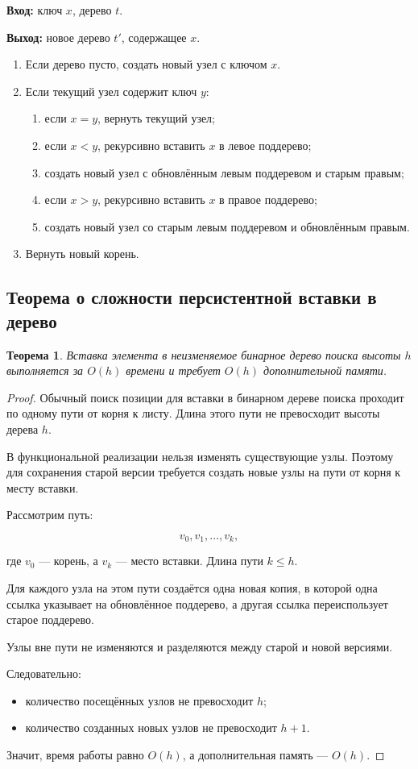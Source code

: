 \documentclass[12pt,a4paper]{article}
\newtheorem{theorem}{Теорема}
\begin{document}
\textbf{Вход:} ключ $x$, дерево $t$.

\textbf{Выход:} новое дерево $t'$, содержащее $x$.

\begin{enumerate}
  \item Если дерево пусто, создать новый узел с ключом $x$.
  \item Если текущий узел содержит ключ $y$:
  \begin{enumerate}
    \item если $x = y$, вернуть текущий узел;
    \item если $x < y$, рекурсивно вставить $x$ в левое поддерево;
    \item создать новый узел с обновлённым левым поддеревом и старым правым;
    \item если $x > y$, рекурсивно вставить $x$ в правое поддерево;
    \item создать новый узел со старым левым поддеревом и обновлённым правым.
  \end{enumerate}
  \item Вернуть новый корень.
\end{enumerate}

\subsection{Теорема о сложности персистентной вставки в дерево}

\begin{theorem}
Вставка элемента в неизменяемое бинарное дерево поиска высоты $h$ выполняется за $O(h)$ времени и требует $O(h)$ дополнительной памяти.
\end{theorem}

\begin{proof}
Обычный поиск позиции для вставки в бинарном дереве поиска проходит по одному пути от корня к листу. Длина этого пути не превосходит высоты дерева $h$.

В функциональной реализации нельзя изменять существующие узлы. Поэтому для сохранения старой версии требуется создать новые узлы на пути от корня к месту вставки.

Рассмотрим путь:

\[
v_0, v_1, \dots, v_k,
\]

где $v_0$ --- корень, а $v_k$ --- место вставки. Длина пути $k \le h$.

Для каждого узла на этом пути создаётся одна новая копия, в которой одна ссылка указывает на обновлённое поддерево, а другая ссылка переиспользует старое поддерево.

Узлы вне пути не изменяются и разделяются между старой и новой версиями.

Следовательно:
\begin{itemize}
  \item количество посещённых узлов не превосходит $h$;
  \item количество созданных новых узлов не превосходит $h+1$.
\end{itemize}

Значит, время работы равно $O(h)$, а дополнительная память --- $O(h)$.
\end{proof}
\end{document}
